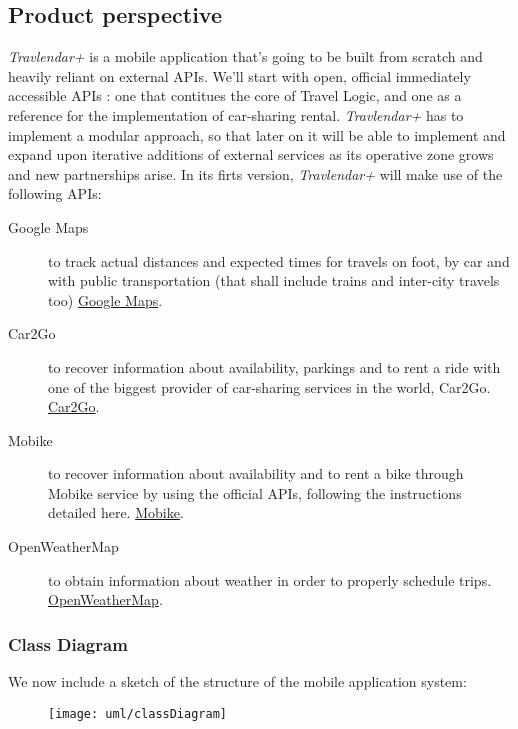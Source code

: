 \subsection{Product perspective}

	\textit{Travlendar+} is a mobile application that’s going to be built from scratch and heavily reliant on external APIs. We’ll start with open, official immediately accessible APIs : one that contitues the core of Travel Logic, and one as a reference for the implementation of car-sharing rental.
	\textit{Travlendar+} has to implement a modular approach, so that later on it will be able to implement and expand upon iterative additions of external services as its operative zone grows and new partnerships arise. In its firts version, \textit{Travlendar+} will make use of the following APIs:
		
		\begin{description}
			\item[Google Maps] to track actual distances and expected times for travels on foot, by car and with public transportation (that shall include trains and inter-city travels too) 
				\href{https://developers.google.com/maps/}{Google Maps}.
			
			\item[Car2Go] to recover information about availability, parkings and to rent a ride with one of the biggest provider of car-sharing services in the world, Car2Go.
				\href{https://github.com/car2go/openAPI}{Car2Go}.
	
			\item[Mobike] to recover information about availability and to rent a bike through Mobike service by using the official APIs, following the instructions detailed here.
				\href{https://github.com/ubahnverleih/WoBike}{Mobike}.
			
			\item[OpenWeatherMap] to obtain information about weather in order to properly schedule trips.
				\href{http://openweathermap.org/api}{OpenWeatherMap}.

		\end{description}

	\newpage
	\subsubsection{Class Diagram}
		We now include a sketch of the structure of the mobile application system:
		\begin{figure}[H]
			\texttt{[image: uml/classDiagram]}
		\end{figure}				
			

